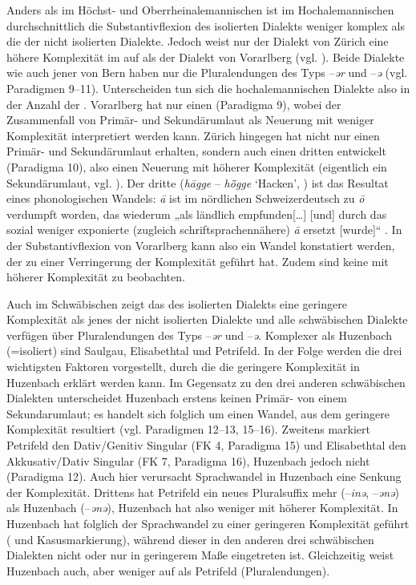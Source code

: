 Anders als im Höchst- und Oberrheinalemannischen ist im Hochalemannischen durchschnittlich die Substantivflexion des isolierten Dialekts weniger komplex als die der nicht isolierten Dialekte. Jedoch weist nur der Dialekt von Zürich eine höhere Komplexität im  auf als der Dialekt von Vorarlberg (vgl. ). Beide Dialekte wie auch jener von Bern haben nur die Pluralendungen des Typs –\textit{ər} und –\textit{ə} (vgl. Paradigmen 9–11). Unterscheiden tun sich die hochalemannischen Dialekte also in der Anzahl der . Vorarlberg hat nur einen  (Paradigma 9), wobei der Zusammenfall von Primär- und Sekundärumlaut als Neuerung mit weniger Komplexität interpretiert werden kann. Zürich hingegen hat nicht nur einen Primär- und Sekundärumlaut erhalten, sondern auch einen dritten  entwickelt (Paradigma 10), also einen Neuerung mit höherer Komplexität (eigentlich ein Sekundärumlaut, vgl. ). Der dritte  (\textit{h\=agge} – \textit{hȫgge} ‘Hacken’, \citealt[114]{Weber1987}) ist das Resultat eines phonologischen Wandels: \textit{\=a} ist im nördlichen Schweizerdeutsch zu \textit{\=o} verdumpft worden, das wiederum „als ländlich empfunden[…] [und] durch das sozial weniger exponierte (zugleich schriftsprachennähere) \textit{\=a} ersetzt [wurde]“ \citep[31]{Hotzenköcherle1984}. In der Substantivflexion von Vorarlberg kann also ein Wandel konstatiert werden, der zu einer Verringerung der Komplexität geführt hat. Zudem sind keine  mit höherer Komplexität zu beobachten.

Auch im Schwäbischen zeigt das  des isolierten Dialekts eine geringere Komplexität als jenes der nicht isolierten Dialekte und alle schwäbischen Dialekte verfügen über Pluralendungen des Typs –\textit{ər} und –\textit{ə}. Komplexer als Huzenbach (=isoliert) sind Saulgau, Elisabethtal und Petrifeld. In der Folge werden die drei wichtigsten Faktoren vorgestellt, durch die die geringere Komplexität in Huzenbach erklärt werden kann. Im Gegensatz zu den drei anderen schwäbischen Dialekten unterscheidet Huzenbach erstens keinen Primär- von einem Sekundarumlaut; es handelt sich folglich um einen Wandel, aus dem geringere Komplexität resultiert (vgl. Paradigmen 12–13, 15–16). Zweitens markiert Petrifeld den Dativ/Genitiv Singular (FK 4, Paradigma 15) und Elisabethtal den Akkusativ/Dativ Singular (FK 7, Paradigma 16), Huzenbach jedoch nicht (Paradigma 12). Auch hier verursacht Sprachwandel in Huzenbach eine Senkung der Komplexität. Drittens hat Petrifeld ein neues Pluralsuffix mehr (–\textit{inə}, –\textit{ənə}) als Huzenbach (–\textit{ənə}), Huzenbach hat also weniger  mit höherer Komplexität. In Huzenbach hat folglich der Sprachwandel zu einer geringeren Komplexität geführt ( und Kasusmarkierung), während dieser in den anderen drei schwäbischen Dialekten nicht oder nur in geringerem Maße eingetreten ist. Gleichzeitig weist Huzenbach auch, aber weniger  auf als Petrifeld (Pluralendungen).

